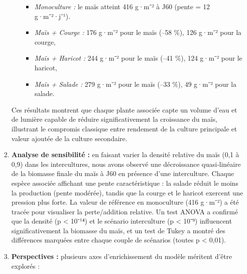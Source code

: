 \documentclass[
]{article}
\begin{document}
\begin{enumerate}
\begin{itemize}
    \begin{itemize}
    \item
      \emph{Monoculture :} le maïs atteint 416 g·m⁻² à J60 (pente = 12
      g·m⁻²·j⁻¹).
    \item
      \emph{Maïs + Courge :} 176 g·m⁻² pour le maïs (--58 \%), 126 g·m⁻²
      pour la courge,
    \item
      \emph{Maïs + Haricot :} 244 g·m⁻² pour le maïs (--41 \%), 124
      g·m⁻² pour le haricot,
    \item
      \emph{Maïs + Salade :} 279 g·m⁻² pour le maïs (--33 \%), 49 g·m⁻²
      pour la salade.
    \end{itemize}
  \end{itemize}

  Ces résultats montrent que chaque plante associée capte un volume
  d'eau et de lumière capable de réduire significativement la croissance
  du maïs, illustrant le compromis classique entre rendement de la
  culture principale et valeur ajoutée de la culture secondaire.
\item
  \textbf{Analyse de sensibilité :} en faisant varier la densité
  relative du maïs (0,1 à 0,9) dans les intercultures, nous avons
  observé une décroissance quasi‐linéaire de la biomasse finale du maïs
  à J60 en présence d'une interculture. Chaque espèce associée affichant
  une pente caractéristique : la salade réduit le moins la production
  (pente modérée), tandis que la courge et le haricot exercent une
  pression plus forte. La valeur de référence en monoculture (416 g·m⁻²)
  a été tracée pour visualiser la perte/addition relative. Un test ANOVA
  a confirmé que la densité (p \textless{} 10⁻¹⁴) et le scénario
  interculture (p \textless{} 10⁻⁹) influencent significativement la
  biomasse du maïs, et un test de Tukey a montré des différences
  marquées entre chaque couple de scénarios (toutes p \textless{} 0,01).
\item
  \textbf{Perspectives :} plusieurs axes d'enrichissement du modèle
  méritent d'être explorés :


\end{enumerate}
\end{document}

